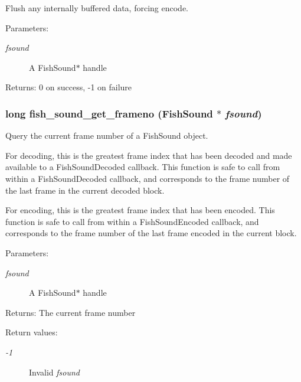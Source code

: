 Flush any internally buffered data, forcing encode. 

\begin{Desc}
\item[Parameters:]
\begin{description}
\item[{\em fsound}]A Fish\-Sound$\ast$ handle \end{description}
\end{Desc}
\begin{Desc}
\item[Returns:]0 on success, -1 on failure \end{Desc}
\subsubsection{\setlength{\rightskip}{0pt plus 5cm}long fish\_\-sound\_\-get\_\-frameno ({\bf Fish\-Sound} $\ast$ {\em fsound})}\label{fishsound_8h_a15}


Query the current frame number of a Fish\-Sound object. 

For decoding, this is the greatest frame index that has been decoded and made available to a Fish\-Sound\-Decoded callback. This function is safe to call from within a Fish\-Sound\-Decoded callback, and corresponds to the frame number of the last frame in the current decoded block.

For encoding, this is the greatest frame index that has been encoded. This function is safe to call from within a Fish\-Sound\-Encoded callback, and corresponds to the frame number of the last frame encoded in the current block.

\begin{Desc}
\item[Parameters:]
\begin{description}
\item[{\em fsound}]A Fish\-Sound$\ast$ handle \end{description}
\end{Desc}
\begin{Desc}
\item[Returns:]The current frame number \end{Desc}
\begin{Desc}
\item[Return values:]
\begin{description}
\item[{\em -1}]Invalid {\em fsound\/} \end{description}
\end{Desc}

